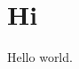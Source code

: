\documentclass{report}
\begin{document}
\chapter{Hi}
\pagestyle{empty}
  Hello world.
\end{document}

